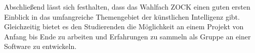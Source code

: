 \documentclass[12pt,a4paper,bibliography=totocnumbered,listof=totocnumbered]{article}
\begin{document}
Abschließend lässt sich festhalten, dass das Wahlfach ZOCK einen guten ersten Einblick in das umfangreiche Themengebiet der künstlichen Intelligenz gibt. Gleichzeitig bietet es den Studierenden die Möglichkeit an einem Projekt von Anfang bis Ende zu arbeiten und Erfahrungen zu sammeln als Gruppe an einer Software zu entwickeln. 
\renewcommand\refname{Quellenverzeichnis}


\pagebreak
\end{document}

